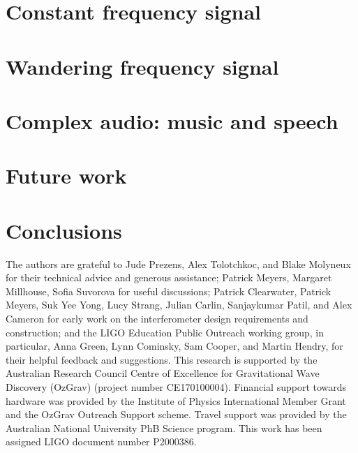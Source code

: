 \documentclass[aps,pra,superscriptaddress,reprint]{revtex4-2}
\begin{document}
\section{Constant frequency signal}
\label{sec:single_tone}


 
\section{Wandering frequency signal}
\label{sec:viterbi_wandering}



\section{Complex audio: music and speech}
\label{sec:optical_microphone}



\section{Future work}
\label{sec:future_work}



\section{Conclusions}
\label{sec:conclusions}




\begin{acknowledgments}

The authors are grateful to Jude Prezens, Alex Tolotchkoc, and Blake Molyneux for their technical advice and generous assistance; Patrick Meyers, Margaret Millhouse, Sofia Suvorova for useful discussions; Patrick Clearwater, Patrick Meyers, Suk Yee Yong, Lucy Strang, Julian Carlin, Sanjaykumar Patil, and Alex Cameron for early work on the interferometer design requirements and construction; and the LIGO Education Public Outreach working group, in particular, Anna Green, Lynn Cominsky, Sam Cooper, and Martin Hendry, for their helpful feedback and suggestions.  
This research is supported by the Australian Research Council Centre of Excellence for Gravitational Wave Discovery (OzGrav) (project number CE170100004). 
Financial support towards hardware was provided by the Institute of Physics International Member Grant and the OzGrav Outreach Support scheme. 
Travel support was provided by the Australian National University PhB Science program.
This work has been assigned LIGO document number P2000386.

\end{acknowledgments}


\appendix




\end{document}
